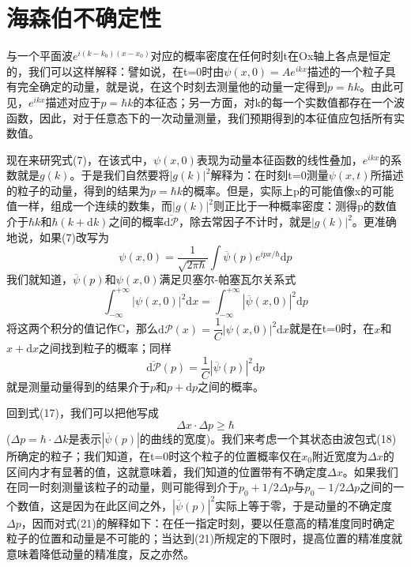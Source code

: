 \documentclass[]{article}
\begin{document}
\section{海森伯不确定性}
与一个平面波$e^{i(k-k_0)(x-x_0)}$对应的概率密度在任何时刻t在Ox轴上各点是恒定的，我们可以这样解释：譬如说，在t=0时由$\psi(x,0)=Ae^{ikx}$描述的一个粒子具有完全确定的动量，就是说，在这个时刻去测量他的动量一定得到$p=\hbar k$。由此可见，$e^{ikx}$描述对应于$p=\hbar k$的本征态；另一方面，对k的每一个实数值都存在一个波函数，因此，对于任意态下的一次动量测量，我们预期得到的本征值应包括所有实数值。\par 
现在来研究式(7)，在该式中，$\psi(x,0)$表现为动量本征函数的线性叠加，$e^{ikx}$的系数就是$g(k)$。于是我们自然要将$|g(k)|^2$解释为：在时刻t=0测量$\psi(x,t)$所描述的粒子的动量，得到的结果为$p=\hbar k$的概率。但是，实际上p的可能值像x的可能值一样，组成一个连续的数集，而$|g(k)|^2$则正比于一种概率密度：测得p的数值介于$\hbar k$和$\hbar(k+\mathrm{d}k)$之间的概率$\overline{\mathrm{d}\mathscr{P}}$，除去常因子不计时，就是$|g(k)|^2$。更准确地说，如果(7)改写为
\begin{equation}
	\psi(x,0)=\dfrac{1}{\sqrt{2\pi\hbar}}\int\overline{\psi}(p)e^{ipx/\hbar}\mathrm{d}p
\end{equation}
我们就知道，$\overline{\psi}(p)$和$\psi(x,0)$满足贝塞尔-帕塞瓦尔关系式
\begin{equation}
	\int^{+\infty}_{-\infty}|\psi(x,0)|^2\mathrm{d}x=\int^{+\infty}_{-\infty}|\overline{\psi}(x,0)|^2\mathrm{d}p
\end{equation}
将这两个积分的值记作C，那么$\mathrm{d}\mathscr{P}(x)=\dfrac{1}{C}|\psi(x,0)|^2\mathrm{d}x$就是在t=0时，在$x$和$x+\mathrm{d}x$之间找到粒子的概率；同样
\begin{equation}
	\overline{\mathrm{d}\mathscr{P}}(p)=\dfrac{1}{C}|\overline{\psi}(p)|^2\mathrm{d}p
\end{equation}
就是测量动量得到的结果介于$p$和$p+\mathrm{d}p$之间的概率。\par 
回到式(17)，我们可以把他写成
\begin{equation}
	\Delta x\cdot\Delta p\geqslant\hbar
\end{equation}
($\Delta p=\hbar\cdot\Delta k$是表示$|\overline{\psi}(p)|$的曲线的宽度)。我们来考虑一个其状态由波包式(18)所确定的粒子；我们知道，在t=0时这个粒子的位置概率仅在$x_0$附近宽度为$\Delta x$的区间内才有显著的值，这就意味着，我们知道的位置带有不确定度$\Delta x$。如果我们在同一时刻测量该粒子的动量，则可能得到介于$p_0+1/2\Delta p$与$p_0-1/2\Delta p$之间的一个数值，这是因为在此区间之外，$|\overline{\psi}(p)|^2$实际上等于零，于是动量的不确定度$\Delta p$，因而对式(21)的解释如下：在任一指定时刻，要以任意高的精准度同时确定粒子的位置和动量是不可能的；当达到(21)所规定的下限时，提高位置的精准度就意味着降低动量的精准度，反之亦然。
\end{document}
